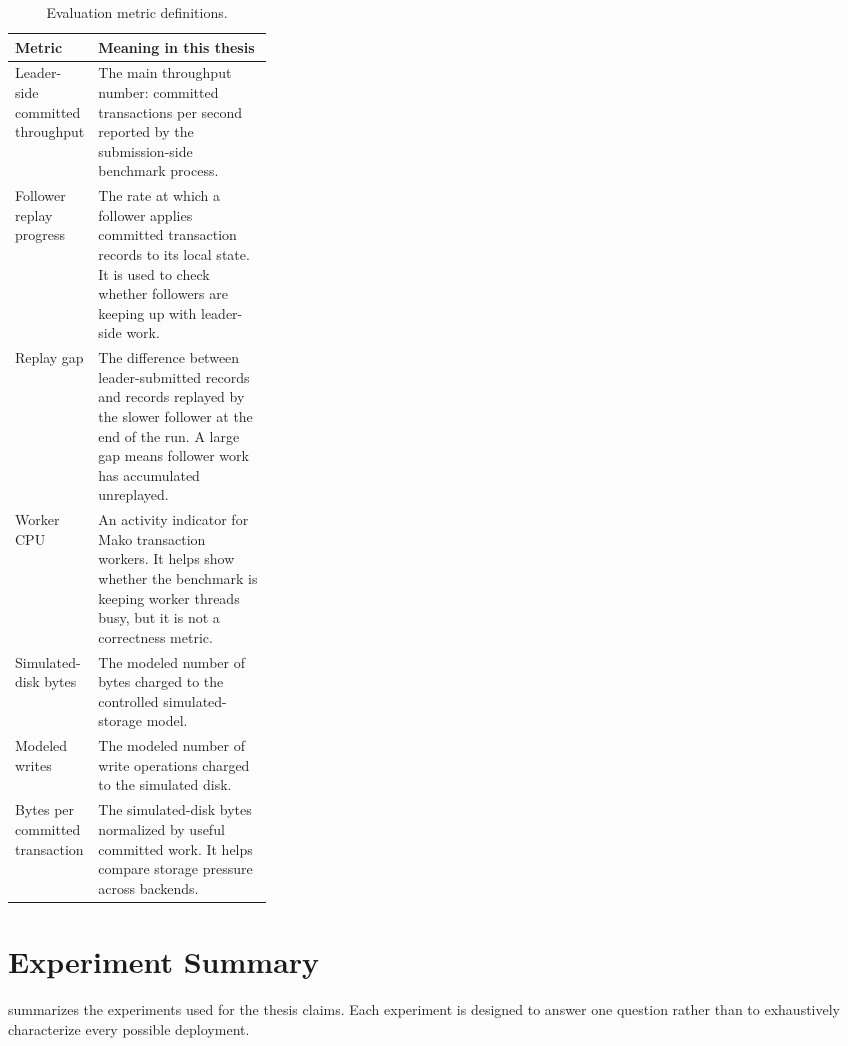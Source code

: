 \begin{table}[htbp]
\centering
\caption[Evaluation metric definitions]{Evaluation metric definitions.}
\label{tab:appendix-metric-definitions}
\small
\begin{tabularx}{\linewidth}{@{}>{\raggedright\arraybackslash}p{0.30\linewidth}X@{}}
\toprule
\textbf{Metric} & \textbf{Meaning in this thesis} \\
\midrule
Leader-side committed throughput &
The main throughput number: committed transactions per second reported by the
submission-side benchmark process. \\
\addlinespace
Follower replay progress &
The rate at which a follower applies committed transaction records to its local
state. It is used to check whether followers are keeping up with leader-side
work. \\
\addlinespace
Replay gap &
The difference between leader-submitted records and records replayed by the
slower follower at the end of the run. A large gap means follower work has
accumulated unreplayed. \\
\addlinespace
Worker CPU &
An activity indicator for Mako transaction workers. It helps show whether the
benchmark is keeping worker threads busy, but it is not a correctness metric. \\
\addlinespace
Simulated-disk bytes &
The modeled number of bytes charged to the controlled simulated-storage model. \\
\addlinespace
Modeled writes &
The modeled number of write operations charged to the simulated disk. \\
\addlinespace
Bytes per committed transaction &
The simulated-disk bytes normalized by useful committed work. It helps compare
storage pressure across backends. \\
\bottomrule
\end{tabularx}
\end{table}

\section{Experiment Summary}

 summarizes the experiments used for
the thesis claims. Each experiment is designed to answer one question rather
than to exhaustively characterize every possible deployment.

